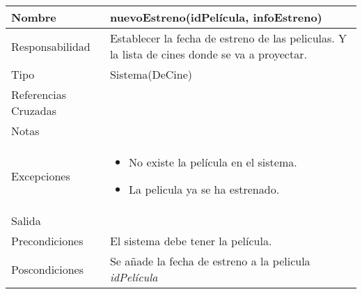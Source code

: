 \documentclass{article}
\begin{document}
\begin{table}[h]
\begin{tabular}{|l|l|l|l|l|l|}
\hline
\multicolumn{2}{|p{3cm}|}{Nombre} & \multicolumn{4}{p{10cm}|}{\textbf{nuevoEstreno(idPelícula, infoEstreno)}}\\
\hline
\multicolumn{2}{|p{3cm}|}{Responsabilidad} & \multicolumn{4}{p{10cm}|}{Establecer la fecha de estreno de las peliculas. Y la lista de cines donde se va a proyectar.} \\
\hline
\multicolumn{2}{|p{3cm}|}{Tipo} & \multicolumn{4}{p{10cm}|}{Sistema(DeCine)} \\
\hline
\multicolumn{2}{|p{3cm}|}{Referencias Cruzadas} & \multicolumn{4}{p{10cm}|}{} \\
\hline
\multicolumn{2}{|p{3cm}|}{Notas} & \multicolumn{4}{p{10cm}|}{} \\
\hline
\multicolumn{2}{|p{3cm}|}{Excepciones} & \multicolumn{4}{p{10cm}|}{\begin{itemize}
\item No existe la película en el sistema.
\item La pelicula ya se ha estrenado.
\end{itemize}} \\
\hline
\multicolumn{2}{|p{3cm}|}{Salida} & \multicolumn{4}{p{10cm}|}{} \\
\hline
\multicolumn{2}{|p{3cm}|}{Precondiciones} & \multicolumn{4}{p{10cm}|}{El sistema debe tener la película.} \\
\hline
\multicolumn{2}{|p{3cm}|}{Poscondiciones} & \multicolumn{4}{p{10cm}|}{Se añade la fecha de estreno a la pelicula \textit{idPelícula}} \\
\hline
\end{tabular}
\end{table}
\end{document}
